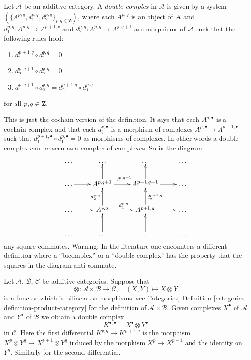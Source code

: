 \begin{definition}
\label{definition-double-complex}
\begin{reference}
\cite[Chapter I, \S 4, no. 27, pp. 219--220]{FAC}
\end{reference}
Let $\mathcal{A}$ be an additive category.
A {\it double complex} in $\mathcal{A}$ is given
by a system $(\{A^{p, q}, d_1^{p, q}, d_2^{p, q}\}_{p, q\in \mathbf{Z}})$,
where each $A^{p, q}$ is an object of $\mathcal{A}$ and
$d_1^{p, q} : A^{p, q} \to A^{p + 1, q}$ and
$d_2^{p, q} : A^{p, q} \to A^{p, q + 1}$ are morphisms of $\mathcal{A}$
such that the following rules hold:
\begin{enumerate}
\item $d_1^{p + 1, q} \circ d_1^{p, q} = 0$
\item $d_2^{p, q + 1} \circ d_2^{p, q} = 0$
\item $d_1^{p, q + 1} \circ d_2^{p, q} = d_2^{p + 1, q} \circ d_1^{p, q}$
\end{enumerate}
for all $p, q \in \mathbf{Z}$.
\end{definition}

\noindent
This is just the cochain version of the definition.
It says that each $A^{p, \bullet}$ is a cochain complex
and that each $d_1^{p, \bullet}$ is a morphism of complexes
$A^{p, \bullet} \to A^{p + 1, \bullet}$ such that
$d_1^{p + 1, \bullet} \circ d_1^{p, \bullet} = 0$ as morphisms
of complexes. In other words a double complex can be seen as
a complex of complexes. So in the diagram
$$
\xymatrix{
\ldots &
\ldots &
\ldots &
\ldots \\
\ldots \ar[r] &
A^{p, q + 1} \ar[r]^{d_1^{p, q + 1}} \ar[u] &
A^{p + 1, q + 1} \ar[r] \ar[u] &
\ldots \\
\ldots \ar[r] &
A^{p, q} \ar[r]^{d_1^{p, q}} \ar[u]^{d_2^{p, q}} &
A^{p + 1, q} \ar[r] \ar[u]_{d_2^{p + 1, q}} &
\ldots \\
\ldots &
\ldots \ar[u] &
\ldots \ar[u] &
\ldots
}
$$
any square commutes.
Warning: In the literature one encounters a different definition
where a ``bicomplex'' or  a ``double complex'' has the property that
the squares in the diagram anti-commute.

\begin{example}
\label{example-double-complex-as-tensor-product-of}
Let $\mathcal{A}$, $\mathcal{B}$, $\mathcal{C}$ be additive categories.
Suppose that
$$
\otimes : \mathcal{A} \times \mathcal{B} \longrightarrow \mathcal{C},
\quad
(X, Y) \longmapsto X \otimes Y
$$
is a functor which is bilinear on morphisms, see
Categories, Definition \ref{categories-definition-product-category}
for the definition of $\mathcal{A} \times \mathcal{B}$.
Given complexes $X^\bullet$ of $\mathcal{A}$ and $Y^\bullet$
of $\mathcal{B}$ we obtain a double complex
$$
K^{\bullet, \bullet} = X^\bullet \otimes Y^\bullet
$$
in $\mathcal{C}$. Here the first differential
$K^{p, q} \to K^{p + 1, q}$ is the morphism
$X^p \otimes Y^q \to X^{p + 1} \otimes Y^q$ induced by
the morphism $X^p \to X^{p + 1}$ and the identity on $Y^q$.
Similarly for the second differential.
\end{example}

